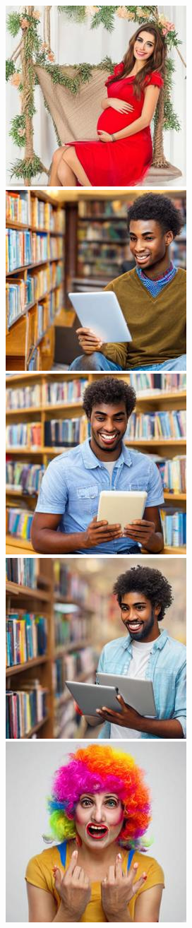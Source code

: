 \begin{figure}[h!]
\begin{subfigure}[t]{0.32\linewidth}
    	\includegraphics[width=0.32\linewidth]{figs/samples_appendix_4/adjmat_cfg_2_ode_prompt_16_image_2.jpg}\\ 
    	\includegraphics[width=0.32\linewidth]{figs/samples_appendix_4/adjmat_cfg_2_ode_prompt_17_image_0.jpg}\;%
    	\includegraphics[width=0.32\linewidth]{figs/samples_appendix_4/adjmat_cfg_2_ode_prompt_17_image_1.jpg}\;%
    	\includegraphics[width=0.32\linewidth]{figs/samples_appendix_4/adjmat_cfg_2_ode_prompt_17_image_2.jpg}\\ 
    	\includegraphics[width=0.32\linewidth]{figs/samples_appendix_4/adjmat_cfg_2_ode_prompt_21_image_0.jpg}\;%

\end{subfigure}
\end{figure}
